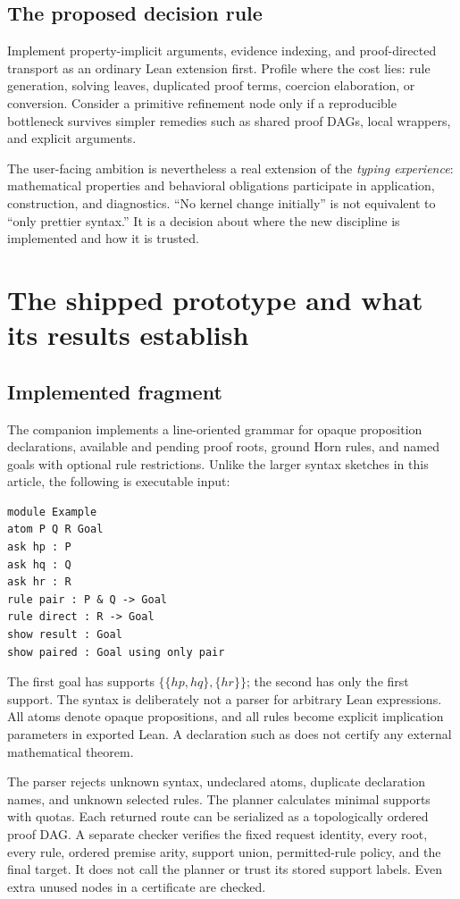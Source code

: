 \documentclass[11pt,a4paper]{article}
\theoremstyle{definition}
\theoremstyle{remark}
\newcommand{\code}[1]{\texttt{\detokenize{#1}}}
\begin{document}
\subsection{The proposed decision rule}
Implement property-implicit arguments, evidence indexing, and proof-directed
transport as an ordinary Lean extension first. Profile where the cost lies:
rule generation, solving leaves, duplicated proof terms, coercion elaboration,
or conversion. Consider a primitive refinement node only if a reproducible
bottleneck survives simpler remedies such as shared proof DAGs, local wrappers,
and explicit arguments.

The user-facing ambition is nevertheless a real extension of the \emph{typing
experience}: mathematical properties and behavioral obligations participate in
application, construction, and diagnostics. ``No kernel change initially''
is not equivalent to ``only prettier syntax.'' It is a decision about where
the new discipline is implemented and how it is trusted.

\section{The shipped prototype and what its results establish}
\label{sec:prototype}

\subsection{Implemented fragment}
The companion \code{prototype/fennel.py} implements a line-oriented grammar for
opaque proposition declarations, available and pending proof roots, ground Horn
rules, and named goals with optional rule restrictions. Unlike the larger
syntax sketches in this article, the following is executable input:
\begin{lstlisting}
module Example
atom P Q R Goal
ask hp : P
ask hq : Q
ask hr : R
rule pair : P & Q -> Goal
rule direct : R -> Goal
show result : Goal
show paired : Goal using only pair
\end{lstlisting}
The first goal has supports $\{\{hp,hq\},\{hr\}\}$; the second has only the
first support. The syntax is deliberately not a parser for arbitrary Lean
expressions. All atoms denote opaque propositions, and all rules become
explicit implication parameters in exported Lean. A declaration such as
\code{rule pair} does not certify any external mathematical theorem.

The parser rejects unknown syntax, undeclared atoms, duplicate declaration
names, and unknown selected rules. The planner calculates minimal supports
with quotas. Each returned route can be serialized as a topologically ordered
proof DAG. A separate checker verifies the fixed request identity, every root,
every rule, ordered premise arity, support union, permitted-rule policy, and
the final target. It does not call the planner or trust its stored support
labels. Even extra unused nodes in a certificate are checked.
\end{document}
